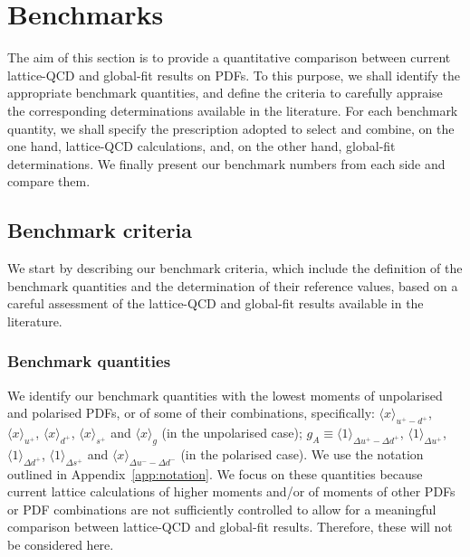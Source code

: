 \section{Benchmarks}
\label{sec:benchmarking}

The aim of this section is to provide a quantitative comparison between 
current lattice-QCD and global-fit results on PDFs.
%
To this purpose, we shall identify the appropriate benchmark quantities, 
and define the criteria to carefully appraise the corresponding determinations
available in the literature.
%
For each benchmark quantity, we shall specify the prescription adopted to 
select and combine, on the one hand, lattice-QCD calculations, and, on the 
other hand, global-fit determinations.
%
We finally present our benchmark numbers from each side and compare them.

\subsection{Benchmark criteria}
\label{subsec:BC}

We start by describing our benchmark criteria, which include the definition
of the benchmark quantities and the determination of their reference values,
based on a careful assessment of the lattice-QCD and global-fit results 
available in the literature.

\subsubsection{Benchmark quantities}
\label{subsubsec:BQ}

We identify our benchmark quantities with the lowest moments of unpolarised 
and polarised PDFs, or of some of their combinations, specifically: 
$\langle x\rangle_{u^+-d^+}$, $\langle x \rangle_{u^+}$, $\langle x \rangle_{d^+}$, 
$\langle x \rangle_{s^+}$ and $\langle x \rangle_{g}$ (in the unpolarised case); 
$g_A\equiv\langle 1 \rangle_{\Delta u^+ - \Delta d ^+}$, 
$\langle 1 \rangle_{\Delta u^+}$, $\langle 1 \rangle_{\Delta d^+}$,  
$\langle 1 \rangle_{\Delta s^+}$ and $\langle x \rangle_{\Delta u^- - \Delta d^-}$ 
(in the polarised case).
%
We use the notation outlined in Appendix~\ref{app:notation}.
%
We focus on these quantities because current lattice 
calculations of higher moments and/or of moments of other PDFs or PDF 
combinations are not sufficiently controlled to allow for a meaningful 
comparison between lattice-QCD and global-fit results.
%
Therefore, these will not be considered here. 

